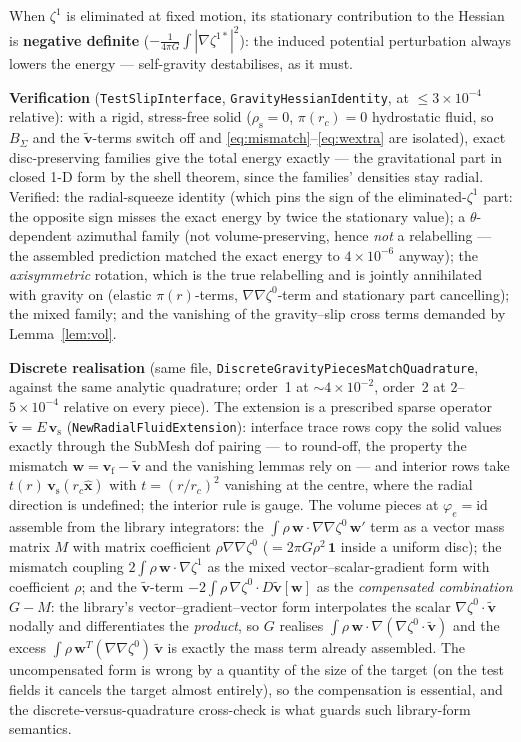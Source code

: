 \documentclass[11pt]{article}
\newcommand{\bv}{\mathbf{v}}
\newcommand{\bw}{\mathbf{w}}
\newcommand{\bx}{\mathbf{x}}
\begin{document}
When $\zeta^1$ is eliminated at fixed motion, its stationary
contribution to the Hessian is \textbf{negative definite}
($-\tfrac{1}{4\pi G}\int|\nabla\zeta^{1*}|^2$): the induced potential
perturbation always lowers the energy --- self-gravity destabilises,
as it must.

\textbf{Verification} (\texttt{TestSlipInterface},
\texttt{GravityHessianIdentity}, at $\le 3\times10^{-4}$ relative):
with a rigid,
stress-free solid ($\rho_{\mathrm{s}} = 0$, $\pi(r_c) = 0$ hydrostatic
fluid, so $B_\Sigma$ and the $\tilde{\bv}$-terms switch off and
\eqref{eq:mismatch}--\eqref{eq:wextra} are isolated), exact
disc-preserving families give the total energy exactly --- the
gravitational part in closed 1-D form by the shell theorem, since the
families' densities stay radial. Verified: the radial-squeeze identity
(which pins the sign of the eliminated-$\zeta^1$ part: the opposite
sign misses the exact energy by twice the stationary value); a $\theta$-dependent azimuthal family (not
volume-preserving, hence \emph{not} a relabelling --- the assembled
prediction matched the exact energy to $4\times10^{-6}$ anyway); the
\emph{axisymmetric} rotation, which is the true relabelling and is
jointly annihilated with gravity on (elastic $\pi(r)$-terms,
$\nabla\nabla\zeta^0$-term and stationary part cancelling); the mixed
family; and the vanishing of the gravity--slip cross terms demanded by
Lemma~\ref{lem:vol}.

\textbf{Discrete realisation} (same file,
\texttt{DiscreteGravityPiecesMatchQuadrature}, against the same analytic
quadrature; order~1 at $\sim\!4\times10^{-2}$, order~2 at
$2$--$5\times10^{-4}$ relative on every piece). The extension is a
prescribed sparse operator $\tilde{\bv} = E\,\bv_{\mathrm{s}}$
(\texttt{NewRadialFluidExtension}): interface trace rows copy the
solid values exactly through the SubMesh dof pairing --- to round-off,
the property the mismatch $\bw = \bv_{\mathrm{f}} - \tilde{\bv}$ and
the vanishing lemmas rely on --- and interior rows take
$t(r)\,\bv_{\mathrm{s}}(r_c\hat{\bx})$ with $t = (r/r_c)^2$ vanishing
at the centre, where the radial direction is undefined; the interior
rule is gauge. The volume pieces at $\varphi_e = \mathrm{id}$ assemble
from the library integrators: the
$\int\rho\,\bw\cdot\nabla\nabla\zeta^0\,\bw'$ term as a vector mass
matrix $M$ with matrix coefficient $\rho\nabla\nabla\zeta^0$
($= 2\pi G\rho^2\,\mathbf{1}$ inside a uniform disc); the mismatch
coupling $2\int\rho\,\bw\cdot\nabla\zeta^1$ as the mixed
vector--scalar-gradient form with coefficient $\rho$; and the
$\tilde{\bv}$-term $-2\int\rho\,\nabla\zeta^0\cdot D\tilde{\bv}[\bw]$
as the \emph{compensated combination} $G - M$: the library's
vector--gradient--vector form interpolates the scalar
$\nabla\zeta^0\cdot\tilde{\bv}$ nodally and differentiates the
\emph{product}, so $G$ realises
$\int\rho\,\bw\cdot\nabla(\nabla\zeta^0\cdot\tilde{\bv})$ and the
excess $\int\rho\,\bw^T(\nabla\nabla\zeta^0)\,\tilde{\bv}$ is exactly
the mass term already assembled. The uncompensated form is wrong by
a quantity of the size of the target (on the test fields it cancels the
target almost entirely), so the compensation is essential, and the
discrete-versus-quadrature cross-check is what guards such
library-form semantics.
\end{document}
